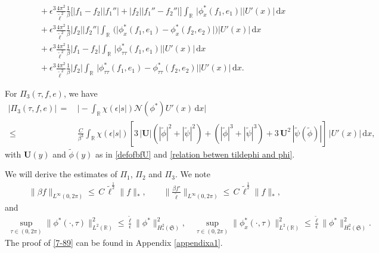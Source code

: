 \documentclass[10pt, reqno]{amsart}
\numberwithin{equation}{section}
\theoremstyle{definition}
\begin{document}
{\begin{align}
&\quad + \epsilon^3 \frac{4\pi^2}{{\tilde\ell}^2}\frac{1}{\beta} \Big[\big|f_1- f_2\big|| f_1''| +|f_2| |f_1''- f_2''|\Big]\int_{\mathbb R}\, \big|\phi^*_x(f_1, e_1)\big||U'(x)|\,{\mathrm d}x
\nonumber\\[2mm]
&\quad + \epsilon^3 \frac{4\pi^2}{{\tilde\ell}^2}\frac{1}{\beta}  |f_2||f_2''| \int_{\mathbb R}\, \Big(\big|\phi^*_x(f_1, e_1)-\phi^*_x(f_2, e_2)\big| \Big)|U'(x)|\,{\mathrm d}x
\nonumber\\[2mm]
&\quad + \epsilon^3 \frac{4\pi^2}{{\tilde\ell}^2}\frac{1}{\beta}\big|f_1-f_2\big|
 \int_{\mathbb R}\,\big|\phi^*_{\tau\tau}(f_1, e_1)\big| |U'(x)|\,{\mathrm d}x
\nonumber\\[2mm]
&\quad + \epsilon^3 \frac{4\pi^2}{{\tilde\ell}^2}\frac{1}{\beta}\big|f_2\big|
 \int_{\mathbb R}\, \big|\phi^*_{\tau\tau}(f_1, e_1)- \phi^*_{\tau\tau}(f_2, e_2)\big| |U'(x)|\,{\mathrm d}x.
\end{align}


\medskip
 For  $\Pi_3(\tau, f, e)$, we have
\begin{align}
\Big|\Pi_3(\tau, f, e) \Big|\,=\,&\Big|-\int_{{\mathbb R}}\chi(\epsilon|s|){\mathcal N}(\phi^*) U'(x)\,{\mathrm d}x\Big|
\nonumber\\[2mm]
\,\leq\,& \frac{C}{\beta^3} \displaystyle\int_{{\mathbb R}}\chi(\epsilon|s|)
\left[3\,|\mathbf{U}| \left(
|{\tilde\phi}|^2+|{\tilde\psi}|^2\right)+\left(
|{\tilde\phi}|^3 +|{\tilde\psi}|^3 \right)
+3\, \mathbf{U}^2 \,| {\tilde\psi}(\tilde \phi)|\right]\,|U'(x)| \,{\mathrm d}x,
\end{align}
with $\mathbf{U}(y)$ and $\tilde\phi(y)$ as in \eqref{defofbfU} and \eqref{relation betwen tildephi and phi}.

\medskip
We will derive the estimates of $\Pi_1$, $\Pi_2$ and $\Pi_3$.
 We note
\begin{align} \label{inequalities for f}
\|\beta f\|_{L^\infty(0, 2\pi)} \le\, C\, \tilde\ell^{\frac12} \|f\|_*,
\qquad
\Big\|\frac{\beta f'}{\tilde \ell}\Big\|_{L^\infty(0, 2\pi)} \le \, C\,\tilde\ell^{\frac12} \|f\|_*,
\end{align}
and
\begin{align} \label{7-89}
\sup_{\tau \in (0, 2\pi)} \|\phi^*(\cdot, \tau)\|^2_{L^2({\mathbb R})} \le \frac{\tilde \ell} {\epsilon} \|\phi^*\|_{H^2_*(\mathfrak S)}^2, \quad
\sup_{\tau \in (0, 2\pi)} \|\phi_x^*(\cdot, \tau)\|^2_{L^2({\mathbb R})} \le \frac{\tilde \ell} {\epsilon} \|\phi^*\|_{H^2_*(\mathfrak S)}^2.
\end{align}
The proof of \eqref{7-89} can be found in Appendix \ref{appendixa1}.

}
\end{document}
